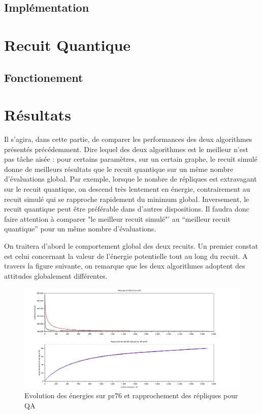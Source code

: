 \documentclass{article}%
\begin{document}
\subsection{Implémentation}

			
\clearpage
\section{Recuit Quantique}
\subsection{Fonctionement}


\clearpage
\section{Résultats}

\vspace{1cm}

		Il s'agira, dans cette partie, de comparer les performances des deux algorithmes présentés précédemment. Dire lequel des deux algorithmes est le meilleur n'est pas tâche aisée : pour certains paramètres, sur un certain graphe, le recuit simulé donne de meilleurs résultats que le recuit quantique sur un même nombre d'évaluations global. Par exemple, lorsque le nombre de répliques est extravagant sur le recuit quantique, on descend très lentement en énergie, contrairement au recuit simulé qui se rapproche rapidement du minimum global. Inversement, le recuit quantique peut être préférable dans d'autres dispositions. Il faudra donc faire attention à comparer "le meilleur recuit simulé"' au "`meilleur recuit quantique"' pour un même nombre d'évaluations.
		
\vspace{1cm}

		On traitera d'abord le comportement global des deux recuits. Un premier constat est celui concernant la valeur de l'énergie potentielle tout au long du recuit. A travers la figure suivante, on remarque que les deux algorithmes adoptent des attitudes globalement différentes.
		
	\begin{figure}[h]
	\begin{center}
	\includegraphics[scale=0.25]{comparaison_pr76.jpg}
	\caption{Evolution des énergies sur pr76 et rapprochement des répliques pour QA}
	\label{QASA}
	\end{center}
	\end{figure}
		
\end{document}
